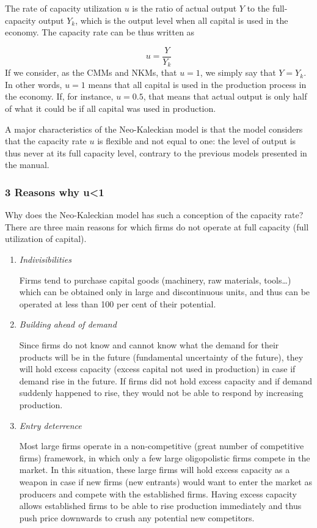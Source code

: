 \documentclass[
  letterpaper,
  DIV=11,
  numbers=noendperiod]{scrreprt}
\begin{document}
The rate of capacity utilization \(u\) is the ratio of actual output
\(Y\) to the full-capacity output \(Y_k\), which is the output level
when all capital is used in the economy. The capacity rate can be thus
written as

\[u = \frac{Y}{Y_k}\] If we consider, as the CMMs and NKMs, that
\(u = 1\), we simply say that \(Y = Y_k\). In other words, \(u = 1\)
means that all capital is used in the production process in the economy.
If, for instance, \(u = 0.5\), that means that actual output is only
half of what it could be if all capital was used in production.

A major characteristics of the Neo-Kaleckian model is that the model
considers that the capacity rate \(u\) is flexible and not equal to one:
the level of output is thus never at its full capacity level, contrary
to the previous models presented in the manual.

\hypertarget{reasons-why-u1}{%
\subsubsection{3 Reasons why u\textless1}\label{reasons-why-u1}}

Why does the Neo-Kaleckian model has such a conception of the capacity
rate? There are three main reasons for which firms do not operate at
full capacity (full utilization of capital).

\begin{enumerate}
\def\labelenumi{\arabic{enumi}.}
\item
  \emph{Indivisibilities}

  Firms tend to purchase capital goods (machinery, raw materials,
  tools\ldots) which can be obtained only in large and discontinuous
  units, and thus can be operated at less than 100 per cent of their
  potential.
\item
  \emph{Building ahead of demand}

  Since firms do not know and cannot know what the demand for their
  products will be in the future (fundamental uncertainty of the
  future), they will hold excess capacity (excess capital not used in
  production) in case if demand rise in the future. If firms did not
  hold excess capacity and if demand suddenly happened to rise, they
  would not be able to respond by increasing production.
\item
  \emph{Entry deterrence}

  Most large firms operate in a non-competitive (great number of
  competitive firms) framework, in which only a few large oligopolistic
  firms compete in the market. In this situation, these large firms will
  hold excess capacity as a weapon in case if new firms (new entrants)
  would want to enter the market as producers and compete with the
  established firms. Having excess capacity allows established firms to
  be able to rise production immediately and thus push price downwards
  to crush any potential new competitors.
\end{enumerate}
\end{document}
